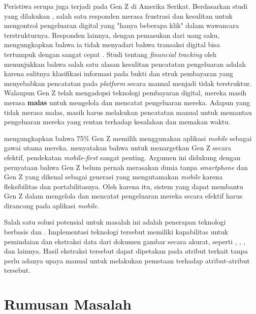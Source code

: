 Peristiwa serupa juga terjadi pada Gen Z di Amerika Serikat. Berdasarkan studi yang dilakukan \cite{lewis2019follow}, salah satu responden merasa frustrasi dan kesulitan untuk mengontrol pengeluaran digital yang "hanya beberapa klik" dalam wawancara terstrukturnya. Responden lainnya, dengan pemasukan dari uang saku, mengungkapkan bahwa ia tidak menyadari bahwa transaksi digital bisa tertumpuk dengan sangat cepat \parencite{lewis2019follow}. Studi tentang \emph{financial tracking} oleh \cite{kaye2014money} menunjukkan bahwa salah satu alasan kesulitan pencatatan pengeluaran adalah karena sulitnya klasifikasi informasi pada bukti dan struk pembayaran yang menyebabkan pencatatan pada \emph{platform} secara manual menjadi tidak terstruktur. Walaupun Gen Z telah mengadopsi teknologi pembayaran digital, mereka masih merasa \textbf{malas} untuk mengelola dan mencatat pengeluaran mereka. Adapun yang tidak merasa malas, masih harus melakukan pencatatan manual untuk memantau pengeluaran mereka yang rentan terhadap kesalahan dan memakan waktu.

\cite{Campfire2024GenZ} mengungkapkan bahwa 75\% Gen Z memilih menggunakan aplikasi \emph{mobile} sebagai gawai utama mereka. \cite{wandhe2024new} menyatakan bahwa untuk menargetkan Gen Z secara efektif, pendekatan \emph{mobile-first} sangat penting. Argumen ini didukung dengan pernyataan bahwa Gen Z belum pernah merasakan dunia tanpa \emph{smartphone} dan Gen Z yang dikenal sebagai generasi yang mengutamakan \emph{mobile} karena fleksibilitas dan portabilitasnya. Oleh karena itu, sistem yang dapat membantu Gen Z dalam mengelola dan mencatat pengeluaran mereka secara efektif harus dirancang pada aplikasi \emph{mobile}.

Salah satu solusi potensial untuk masalah ini adalah penerapan teknologi berbasis \cvfull{} dan \dl{}. Implementasi teknologi tersebut memiliki kapabilitas untuk pemindaian dan ekstraksi data dari dokumen gambar secara akurat, seperti \ocrfull, \cnnfull, \transformer, dan lainnya. Hasil ekstraksi tersebut dapat dipetakan pada atribut terkait tanpa perlu adanya upaya manual untuk melakukan pemetaan terhadap atribut-atribut tersebut.


\section{Rumusan Masalah}
\label{sec:rumusan-masalah}

